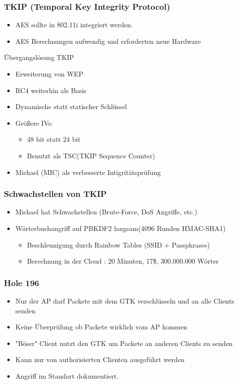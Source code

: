 \documentclass{beamer}
\begin{document}
\begin{frame}
\frametitle{TKIP (Temporal Key Integrity Protocol)}
\begin{itemize}
	\item AES sollte in 802.11i integriert werden.
	\item AES Berechnungen aufwendig und erforderten neue Hardware
\end{itemize}
\begin{block}{Übergangslösung TKIP}
	\begin{itemize}
		\item Erweiterung von WEP
		\item RC4 weiterhin als Basis
		\item Dynamische statt statischer Schlüssel
		\item Größere IVs:
		\begin{itemize}
			\item 48 bit statt 24 bit
			\item Benutzt als TSC(TKIP Sequence Counter)
		\end{itemize}
		\item Michael (MIC) als verbesserte Intigritätsprüfung
	\end{itemize}
\end{block}
\end{frame}

\begin{frame}
\frametitle{Schwachstellen von TKIP}
\begin{itemize}
	\item Michael hat Schwachstellen (Brute-Force, DoS Angriffe, etc.)
	\item Wörterbuchangriff auf PBKDF2 langsam(4096 Runden HMAC-SHA1)
	\begin{itemize}
		\item Beschleunigung durch Rainbow Tables \cite{renderlab} (SSID + Passphrases)
		\item Berechnung in der Cloud \cite{cloudcracker}: 20 Minuten, 17\$, 300.000.000 Wörter
	\end{itemize}
\end{itemize}
\end{frame}


\begin{frame}
\frametitle{Hole 196}
\begin{itemize}
	\item Nur der AP darf Packete mit dem GTK verschlüsseln und an alle Clients senden
	\item Keine Überprüfung ob Packete wirklich vom AP kommen
    \item "Böser" Client nutzt den GTK um Packete an anderen Clients zu senden
	\item Kann nur von authorisierten Clienten ausgeführt werden
	\item Angriff im Standart dokumentiert.
\end{itemize}
\end{frame}
\end{document}
